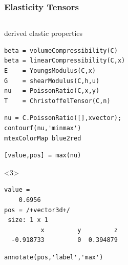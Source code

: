 \documentclass[compress]{beamer}
\begin{document}
\begin{frame}[fragile]
  \frametitle{Elasticity Tensors}

  \vspace{-0.5cm}
  \begin{overlayarea}{\textwidth}{\textheight}

  \begin{columns}
    \begin{column}{7.7cm}

      derived elastic properties
      \vspace{-0.2cm}
\begin{lstlisting}[style=input]
beta = volumeCompressibility(C)
beta = linearCompressibility(C,x)
E    = YoungsModulus(C,x)
G    = shearModulus(C,h,u)
nu   = PoissonRatio(C,x,y)
T    = ChristoffelTensor(C,n)
\end{lstlisting}

\pause

\vspace{-0.2cm}
\begin{lstlisting}[style=input]
nu = C.PoissonRatio([],xvector);
contourf(nu,'minmax')
mtexColorMap blue2red
\end{lstlisting}

\pause

\vspace{-0.2cm}
\begin{lstlisting}[style=input]
[value,pos] = max(nu)
\end{lstlisting}

\begin{onlyenv}<3>
  \vspace{-0.3cm}
  \begin{lstlisting}[style=output]
value =
    0.6956
pos = /+vector3d+/
 size: 1 x 1
          x         y         z
  -0.918733         0  0.394879
  \end{lstlisting}
\end{onlyenv}

\pause

\vspace{-0.2cm}
\begin{lstlisting}[style=input]
annotate(pos,'label','max')
\end{lstlisting}



\end{column}
\end{columns}
\end{overlayarea}
\end{frame}
\end{document}
